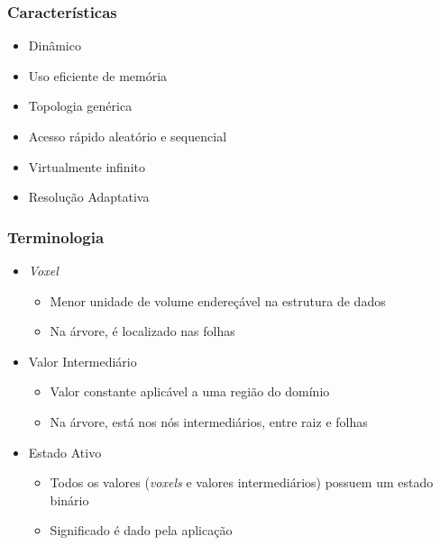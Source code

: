 \documentclass{beamer}
\begin{document}
\begin{frame}

\frametitle{Características}

\begin{itemize}
\item Dinâmico
\item Uso eficiente de memória
\item Topologia genérica
\item Acesso rápido aleatório e sequencial
\item Virtualmente infinito
\item Resolução Adaptativa
\end{itemize}

\end{frame}


\begin{frame}

\frametitle{Terminologia}

\begin{itemize}
\item \emph{Voxel}
\begin{itemize}
\item Menor unidade de volume endereçável na estrutura de dados
\item Na árvore, é localizado nas folhas
\end{itemize}
\item Valor Intermediário
\begin{itemize}
\item Valor constante aplicável a uma região do domínio
\item Na árvore, está nos nós intermediários, entre raiz e folhas
\end{itemize}
\item Estado Ativo
\begin{itemize}
\item Todos os valores (\emph{voxels} e valores intermediários) possuem um estado binário
\item Significado é dado pela aplicação
\end{itemize}
\end{itemize}

\end{frame}
\end{document}
